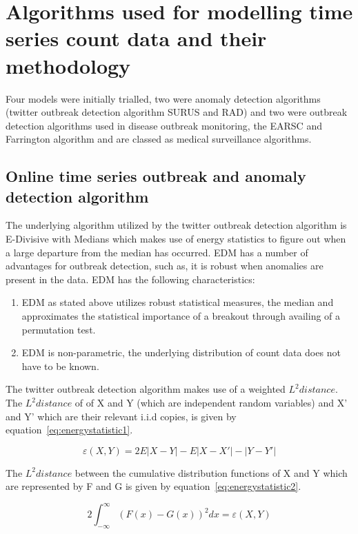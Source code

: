 \section{Algorithms used for modelling time series count data and their methodology}

Four models were initially trialled, two were anomaly detection algorithms (twitter outbreak detection algorithm SURUS and RAD) and two were outbreak detection algorithms used in disease outbreak monitoring, the EARSC and Farrington algorithm and are classed as medical surveillance algorithms. 

\subsection{Online time series outbreak and anomaly detection algorithm}
The underlying algorithm utilized by the twitter outbreak detection algorithm \citep{twitterooutbreak} is E-Divisive with Medians \citep{james2014leveraging}  which makes use of energy statistics to figure out when a large departure from the median has occurred. EDM has a number of advantages for outbreak detection, such as, it is robust when anomalies are present in the data. EDM has the following characteristics:
\begin{enumerate}
\item EDM as stated above utilizes robust statistical measures, the median and approximates the statistical importance of a breakout through availing of a permutation test.
\item EDM is non-parametric, the underlying distribution of count data does not have to be known.
\end{enumerate}

The twitter outbreak detection algorithm makes use of a weighted $L^{2} distance$. The $L^{2} distance$  of of X and Y (which are independent random variables) and X' and Y' which are their relevant i.i.d copies, is given by equation~\ref{eq:energystatistic1}.

\begin{equation} \varepsilon (X,Y) = 2E|X-Y|-E|X-X'|-|Y-Y'| \label{eq:energystatistic1}  \end{equation} 

The $L^{2} distance$  between the cumulative distribution functions of X and Y which are represented by F and G is given by equation~\ref{eq:energystatistic2}. 

\begin{equation} 
2\int_{-\infty}^{\infty} (F(x)-G(x))^2 dx = \varepsilon (X,Y)
\label{eq:energystatistic2}  \end{equation} 

